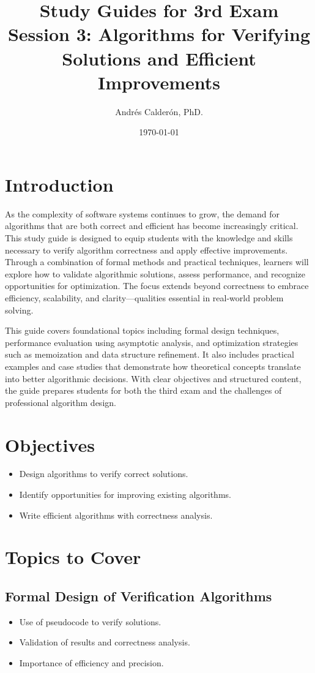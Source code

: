 \documentclass[12pt]{article}
\title{Study Guides for 3rd Exam \\ Session 3: Algorithms for Verifying Solutions and Efficient Improvements}
\author{Andrés Calderón, PhD.}
\date{\today}
\begin{document}
\maketitle

\section*{Introduction}

As the complexity of software systems continues to grow, the demand for algorithms that are both correct and efficient has become increasingly critical. This study guide is designed to equip students with the knowledge and skills necessary to verify algorithm correctness and apply effective improvements. Through a combination of formal methods and practical techniques, learners will explore how to validate algorithmic solutions, assess performance, and recognize opportunities for optimization. The focus extends beyond correctness to embrace efficiency, scalability, and clarity—qualities essential in real-world problem solving.

This guide covers foundational topics including formal design techniques, performance evaluation using asymptotic analysis, and optimization strategies such as memoization and data structure refinement. It also includes practical examples and case studies that demonstrate how theoretical concepts translate into better algorithmic decisions. With clear objectives and structured content, the guide prepares students for both the third exam and the challenges of professional algorithm design.

\section*{Objectives}
\begin{itemize}
    \item Design algorithms to verify correct solutions.
    \item Identify opportunities for improving existing algorithms.
    \item Write efficient algorithms with correctness analysis.
\end{itemize}

\section*{Topics to Cover}

\subsection*{Formal Design of Verification Algorithms}
\begin{itemize}
    \item Use of pseudocode to verify solutions.
    \item Validation of results and correctness analysis.
    \item Importance of efficiency and precision.
\end{itemize}
\end{document}
